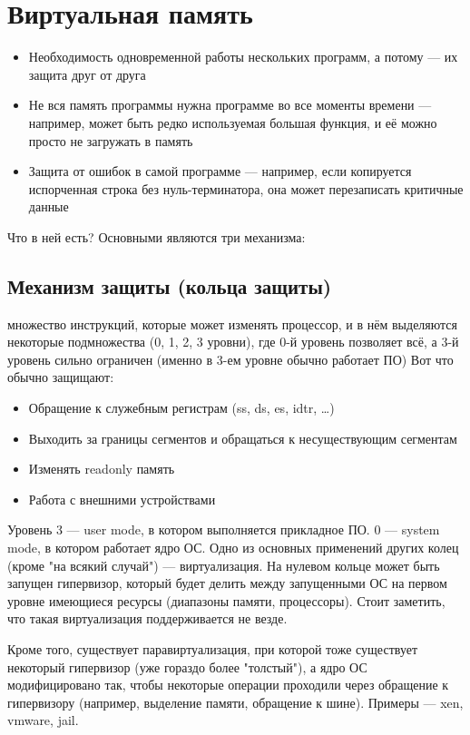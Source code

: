 \documentclass[main]{subfiles}
\begin{document}
\chapter{Виртуальная память}
\begin{itemize}
\item Необходимость одновременной работы нескольких программ, а потому --- их
защита друг от друга
\item Не вся память программы нужна программе во все моменты времени --- например,
может быть редко используемая большая функция, и её можно просто не загружать в память
\item Защита от ошибок в самой программе --- например, если копируется испорченная
строка без нуль-терминатора, она может перезаписать критичные данные
\end{itemize}

Что в ней есть? Основными являются три механизма:
\section{Механизм защиты (кольца защиты)}
множество инструкций,
которые может изменять процессор, и в нём выделяются некоторые подмножества (0, 1, 2, 3 уровни),
где 0-й уровень позволяет всё, а 3-й уровень сильно ограничен (именно в 3-ем уровне
обычно работает ПО)
Вот что обычно защищают:
\begin{itemize}
\item Обращение к служебным регистрам (ss, ds, es, idtr, \dots)
\item Выходить за границы сегментов и обращаться к несуществующим сегментам
\item Изменять readonly память
\item Работа с внешними устройствами
\end{itemize}

Уровень 3 --- user mode, в котором выполняется прикладное ПО. 0 --- system mode,
в котором работает ядро ОС. Одно из основных применений других колец (кроме "на
всякий случай") --- виртуализация. На нулевом кольце может быть запущен гипервизор,
который будет делить между запущенными ОС на первом уровне имеющиеся ресурсы
(диапазоны памяти, процессоры). Стоит заметить, что такая виртуализация поддерживается
не везде.

Кроме того, существует паравиртуализация, при которой тоже существует некоторый
гипервизор (уже гораздо более "толстый"), а ядро ОС модифицировано так, чтобы
некоторые операции проходили через обращение к гипервизору (например, выделение
памяти, обращение к шине). Примеры --- xen, vmware, jail.
\end{document}
